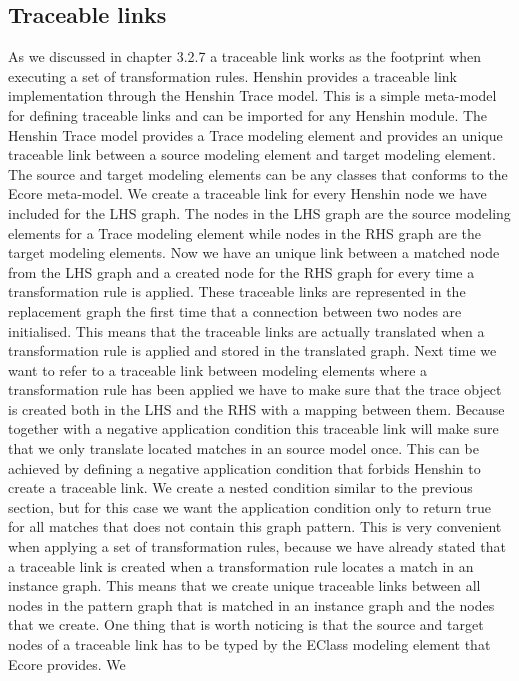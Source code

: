 \subsection{Traceable links}

As we discussed in chapter 3.2.7 a traceable link works as the footprint when
executing a set of transformation rules. Henshin provides a traceable link
implementation through the Henshin Trace model. This is a simple meta-model for
defining traceable links and can be imported for any Henshin module. The Henshin
Trace model provides a Trace modeling element and provides an unique traceable
link between a source modeling element and target modeling element. The source
and target modeling elements can be any classes that conforms to the Ecore
meta-model. We create a traceable link for every Henshin node we have included
for the LHS graph. The nodes in the LHS graph are the source modeling elements
for a Trace modeling element while nodes in the RHS graph are the target
modeling elements. Now we have an unique link between a matched node from the
LHS graph and a created node for the RHS graph for every time a transformation
rule is applied. These traceable links are represented in the replacement graph
the first time that a connection between two nodes are initialised. This means
that the traceable links are actually translated when a transformation rule is
applied and stored in the translated graph. Next time we want to refer to
a traceable link between modeling elements where a transformation rule has been
applied we have to make sure that the trace object is created both in the LHS
and the RHS with a mapping between them. Because together with a negative
application condition this traceable link will make sure that we only translate
located matches in an source model once. This can be achieved by defining a
negative application condition that forbids Henshin to create a traceable link.
We create a nested condition similar to the previous section, but for this case
we want the application condition only to return true for all matches that does
not contain this graph pattern. This is very convenient when applying a set of
transformation rules, because we have already stated that a traceable link is
created when a transformation rule locates a match in an instance graph. This
means that we create unique traceable links between all nodes in the pattern
graph that is matched in an instance graph and the nodes that we create. One
thing that is worth noticing is that the source and target nodes of a traceable
link has to be typed by the EClass modeling element that Ecore provides. We
